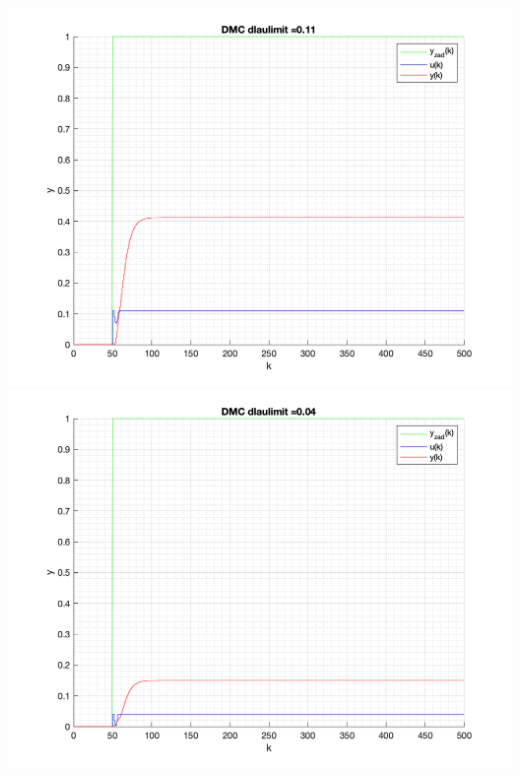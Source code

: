\documentclass[a4paper, 11pt]{article}
\begin{document}
\begin{enumerate}
 \includegraphics{./ModelsP6_ulimit/P4_DMC_ulimit_0.11.png} 
 \includegraphics{./ModelsP6_ulimit/P4_DMC_ulimit_0.04.png} 

\end{enumerate}
\end{document}

